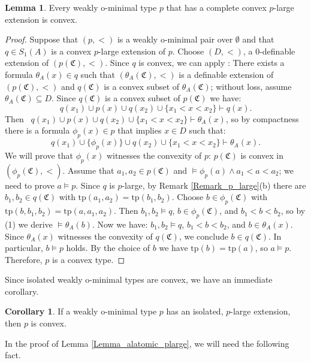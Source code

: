 \documentclass{amsart}
\theoremstyle{definition}
\newtheorem{Lemma}[Theorem]{Lemma}
\newtheorem{Corollary}[Theorem]{Corollary}
\theoremstyle{definition}
\newcommand{\Mon}{\mathfrak C}
\newcommand{\tp}{\mathrm{tp}}
\begin{document}
\begin{Lemma}\label{Lemma_plargeconvex_implies_pconvex}
Every weakly o-minimal type $p$ that has a complete convex $p$-large extension is convex.
\end{Lemma}
\begin{proof}\setcounter{equation}{0}
Suppose that $(p,<)$ is a weakly o-minimal pair over $\emptyset$ and that $q\in S_1(A)$ is a convex $p$-large extension of $p$. Choose $(D,<)$, a $0$-definable extension of $(p(\Mon),<)$. Since $q$ is convex, we can apply \cite[Proposition 3.4]{MTwqom1}: There exists a formula $\theta_A(x)\in q$ such that $(\theta_A(\Mon),<)$ is a definable extension of $(p(\Mon),<)$ and $q(\Mon)$ is a convex subset of $\theta_A(\Mon)$; without loss, assume $\theta_A(\Mon)\subseteq D$.   
Since $q(\Mon)$ is a convex subset of $p(\Mon)$ we have:
$$q(x_1)\cup p(x)\cup q(x_2)\cup\{x_1<x<x_2\}\vdash q(x).$$
Then  \ 
$q(x_1)\cup p(x)\cup q(x_2)\cup\{x_1<x<x_2\}\vdash \theta_A(x)$, so by compactness there is a formula  $\phi_p(x)\in p$ that implies $x\in D$ such that:
\begin{equation}
q(x_1)\cup \{\phi_p(x)\}\cup q(x_2)\cup\{x_1<x<x_2\}\vdash \theta_A(x).
\end{equation} 
We will prove that $\phi_p(x)$ witnesses the convexity of $p$: $p(\Mon)$ is convex in $(\phi_p(\Mon),<)$. Assume that $a_1,a_2\in p(\Mon)$ and $\models \phi_p(a)\land a_1<a<a_2$; we need to prove $a\models p$. Since $q$ is $p$-large, by Remark \ref{Remark_p_large}(b) there are $b_1,b_2\in q(\Mon)$ with $\tp(a_1,a_2)=\tp(b_1,b_2)$. Choose $b\in \phi_p(\Mon)$ with $\tp(b,b_1,b_2)=\tp(a,a_1,a_2)$. Then $b_1,b_2\models q$, $b\in \phi_p(\Mon)$, and $b_1<b<b_2$, so by (1) we derive $\models\theta_A(b)$. 
Now we have: $b_1,b_2\models q$, $b_1<b<b_2$, and $b\in \theta_A(x)$. 
Since $\theta_A(x)$ witnesses the convexity of $q(\Mon)$, we conclude $b\in q(\Mon)$. In particular, $b\models p$ holds. By the choice of $b$ we have $\tp(b)=\tp(a)$, so $a\models p$. Therefore, $p$ is a convex type.
\end{proof}

Since isolated weakly o-minimal types are convex, we have an immediate corollary.

\begin{Corollary}\label{COr_isolated_plarge_is_convex}
If a weakly o-minimal type $p$ has an isolated, $p$-large extension, then $p$ is convex.   
\end{Corollary}
 
In the proof of Lemma \ref{Lemma_alatomic_plarge}, we will need the following fact.
\end{document}
